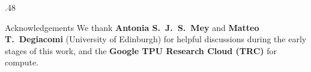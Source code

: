 \documentclass[final]{beamer}
\let\origtextbf\textbf
\renewcommand{\textbf}[1]{\textcolor{oabrown}{\origtextbf{#1}}}
\begin{document}
\begin{frame}[t]
\begin{columns}[t]
\begin{column}{.48\paperwidth}
  \begin{block}{Acknowledgements}
    We thank \textbf{Antonia S.~J.~S.~Mey} and \textbf{Matteo T.~Degiacomi} (University of Edinburgh)
    for helpful discussions during the early stages of this work, and the
    \textbf{Google TPU Research Cloud (TRC)} for compute.
  \end{block}

\end{column}

\end{columns}
\end{frame}
\end{document}
